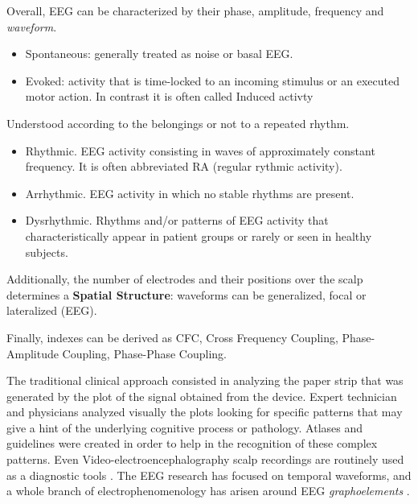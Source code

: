 \documentclass[sensors,article,submit,moreauthors,pdftex,10pt,a4paper]{mdpi}
\begin{document}
Overall, EEG can be characterized by their phase, amplitude,  frequency and \textit{waveform}.

\begin{itemize}
\item Spontaneous: generally treated as noise or basal EEG.
\item Evoked: activity that is time-locked to an incoming stimulus or an executed motor action.  In contrast it is often called Induced activty
\end{itemize}

Understood according to the belongings or not to a repeated rhythm.

\begin{itemize}
\item Rhythmic. EEG activity consisting in waves of approximately constant frequency.  It is often abbreviated RA (regular rythmic activity).
\item Arrhythmic. EEG activity in which no stable rhythms are present.
\item Dysrhythmic. Rhythms and/or patterns of EEG activity that characteristically appear in patient groups or rarely or seen in healthy subjects.
\end{itemize}

Additionally, the number of electrodes and their positions over the scalp determines a \textbf{Spatial Structure}: waveforms can be generalized, focal or lateralized (EEG).

Finally, indexes can be derived as  CFC, Cross Frequency Coupling,  Phase-Amplitude Coupling, Phase-Phase Coupling.

The traditional clinical approach consisted in analyzing the paper strip that was generated by the plot of the signal obtained from the device.  Expert technician and physicians analyzed visually the plots looking for specific patterns that may give a hint of the underlying cognitive process or pathology.   Atlases and guidelines were created in order to help in the recognition of these complex patterns.   Even Video-electroencephalography scalp recordings are routinely used as a diagnostic tools \citep{Giagante2003} .  The EEG research has focused on temporal waveforms, and a whole branch of electrophenomenology has arisen around EEG \textit{graphoelements} \citep{Schomer2010}.  
\end{document}

